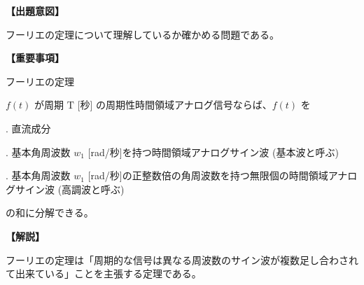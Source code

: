 \noindent \textbf{【出題意図】}

\noindent フーリエの定理について理解しているか確かめる問題である。

\vspace{1em}
\noindent \textbf{【重要事項】}

\noindent フーリエの定理

\smallskip
$f(t)$ が周期 $\textrm{T}$ [秒] の周期性時間領域アナログ信号ならば、$f(t)$ を

. 直流成分

. 基本角周波数 $w_1$ [rad/秒]を持つ時間領域アナログサイン波 (基本波と呼ぶ)

. 基本角周波数 $w_1$ [rad/秒]の正整数倍の角周波数を持つ無限個の時間領域アナログサイン波 (高調波と呼ぶ)

\smallskip
の和に分解できる。


\vspace{1em}
\noindent \textbf{【解説】}

\noindent フーリエの定理は「周期的な信号は異なる周波数のサイン波が複数足し合わされて出来ている」ことを主張する定理である。
